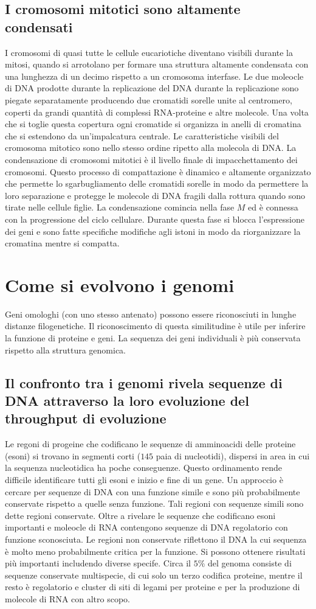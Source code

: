 \subsection{I cromosomi mitotici sono altamente condensati}
I cromosomi di quasi tutte le cellule eucariotiche diventano visibili durante la mitosi, quando si arrotolano per formare una struttura altamente condensata con una lunghezza di un
decimo rispetto a un cromosoma interfase. Le due moleocle di DNA prodotte durante la replicazione del DNA durante la replicazione sono piegate separatamente producendo due cromatidi 
sorelle unite al centromero, coperti da grandi quantit\`a di complessi RNA-proteine e altre molecole. Una volta che si toglie questa copertura ogni cromatide si organizza in anelli di 
cromatina che si estendono da un'impalcatura centrale. Le caratteristiche visibili del cromosoma mitotico sono nello stesso ordine ripetto alla molecola di DNA. La condensazione di 
cromosomi mitotici \`e il livello finale di impacchettamento dei cromosomi. Questo processo di compattazione \`e dinamico e altamente organizzato che permette lo sgarbugliamento delle
cromatidi sorelle in modo da permettere la loro separazione e protegge le molecole di DNA fragili dalla rottura quando sono tirate nelle cellule figlie. La condensazione comincia nella
fase $M$ ed \`e connessa con la progressione del ciclo cellulare. Durante questa fase si blocca l'espressione dei geni e sono fatte specifiche modifiche agli istoni in modo da 
riorganizzare la cromatina mentre si compatta. 
\section{Come si evolvono i genomi}
Geni omologhi (con uno stesso antenato) possono essere riconosciuti in lunghe distanze filogenetiche. Il riconoscimento di questa similitudine \`e utile per inferire la funzione di 
proteine e geni. La sequenza dei geni individuali \`e pi\`u conservata rispetto alla struttura genomica. 
\subsection{Il confronto tra i genomi rivela sequenze di DNA attraverso la loro evoluzione del throughput di evoluzione}
Le regoni di progeine che codificano le sequenze di amminoacidi delle proteine (esoni) si trovano in segmenti corti ($145$ paia di nucleotidi), dispersi in area in cui la sequenza 
nucleotidica ha poche conseguenze. Questo ordinamento rende difficile identificare tutti gli esoni e inizio e fine di un gene. Un approccio \`e cercare per sequenze di DNA con una 
funzione simile e sono pi\`u probabilmente conservate rispetto a quelle senza funzione. Tali regioni con sequenze simili sono dette regioni conservate. Oltre a rivelare le sequenze che
codificano esoni importanti e moleocle di RNA contengono sequenze di DNA regolatorio con funzione sconosciuta. Le regioni non conservate riflettono il DNA la cui sequenza \`e molto 
meno probabilmente critica per la funzione. Si possono ottenere risultati pi\`u importanti includendo diverse specife. Circa il $5\%$ del genoma consiste di sequenze conservate 
multispecie, di cui solo un terzo codifica proteine, mentre il resto \`e regolatorio e cluster di siti di legami per proteine e per la produzione di molecole di RNA con altro scopo. 
